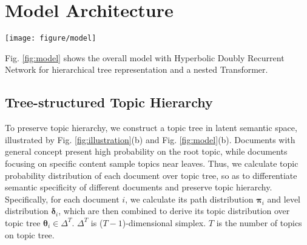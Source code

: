 \section{Model Architecture}

\begin{figure*}[t]
	\centering
	\texttt{[image: figure/model]}
	\vspace{-0.2cm}
	\caption{Illustration of (a) our proposed GTFormer, (b) topic tree embedding, and (c) Hyperbolic Doubly Recurrent Neural Network. Hyperbolic operations are omitted for clarity. Best seen in color.}
	\label{fig:model}
	\vspace{-0.4cm}
\end{figure*}

Fig. \ref{fig:model} shows the overall model with Hyperbolic Doubly Recurrent Network for hierarchical tree representation and a nested Transformer.

\subsection{Tree-structured Topic Hierarchy}
\label{sec:tree_structured_topic_hierarchy}

To preserve topic hierarchy, we construct a topic tree in latent semantic space, illustrated by Fig. \ref{fig:illustration}(b) and Fig. \ref{fig:model}(b). %
Documents with general concept present high probability on the root topic, while documents focusing on specific content sample topics near leaves. Thus, we calculate topic probability distribution of each document over topic tree, so as to differentiate semantic specificity of different documents and preserve topic hierarchy. Specifically, for each document $ i $, we calculate its path distribution $ \bm{\pi}_i $ and level distribution $ \bm{\delta}_i $, which are then combined to derive its topic distribution over topic tree $ \bm{\theta}_i\in\Delta^T $. $ \Delta^T $ is ($ T-1 $)-dimensional simplex. $ T $ is the number of topics on topic tree.

